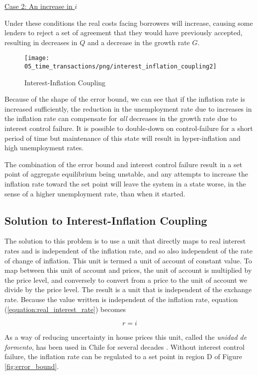 \underline{Case 2: An increase in $i$} 

Under these conditions the real costs facing borrowers will increase, causing some lenders to reject
a set of agreement that they would have previously accepted, resulting in decreases in $Q$ and a
decrease in the growth rate $G$.

\begin{figure}[H]
\centering
\texttt{[image: 05\_time\_transactions/png/interest\_inflation\_coupling2]}
\caption{Interest-Inflation Coupling}
\label{fig:interest_inflation_coupling2}
\end{figure}

Because of the shape of the error bound, we can see that if the inflation rate is increased
sufficiently, the reduction in the unemployment rate due to increases in the inflation rate can
compensate for \emph{all} decreases in the growth rate due to interest control failure. It is
possible to double-down on control-failure for a short period of time but maintenance of this state
will result in hyper-inflation and high unemployment rates.

The combination of the error bound and interest control failure result in a set point of aggregate
equilibrium being unstable, and any attempts to increase the inflation rate toward the set point
will leave the system in a state worse, in the sense of a higher unemployment rate, than when it
started.

\subsection{Solution to Interest-Inflation Coupling}
\label{sec:constant_purchasing_power}

The solution to this problem is to use a unit that directly maps to real interest rates and is
independent of the inflation rate, and so also independent of the rate of change of inflation. This
unit is termed a unit of account of constant value. To map between this unit of account and prices,
the unit of account is multiplied by the price level, and conversely to convert from a price to the
unit of account we divide by the price level. The result is a unit that is independent of the
exchange rate. Because the value written is independent of the inflation rate, equation
(\ref{equation:real_interest_rate}) becomes

\[ r = i \]

As a way of reducing uncertainty in house prices this unit, called the \textit{unidad de formento},
has been used in Chile for several decades \cite{shiller1998}. Without interest control failure, the
inflation rate can be regulated to a set point in region D of Figure \ref{fig:error_bound}. 
